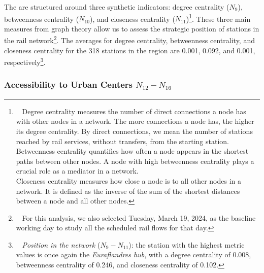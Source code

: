 \begin{refsegment}
The  are structured around three synthetic indicators: degree centrality (\(N_{9}\)), betweenness centrality (\(N_{10}\)), and closeness centrality (\(N_{11}\))\footnote{~
    Degree centrality measures the number of direct connections a node has with other nodes in a network. The more connections a node has, the higher its degree centrality. By direct connections, we mean the number of stations reached by rail services, without transfers, from the starting station.
    \\
    Betweenness centrality quantifies how often a node appears in the shortest paths between other nodes. A node with high betweenness centrality plays a crucial role as a mediator in a network.
    \\
    Closeness centrality measures how close a node is to all other nodes in a network. It is defined as the inverse of the sum of the shortest distances between a node and all other nodes.
}. These three main measures from graph theory allow us to assess the strategic position of stations in the rail network\footnote{~
    For this analysis, we also selected Tuesday, March 19, 2024, as the baseline working day to study all the scheduled rail flows for that day.
}. The averages for degree centrality, betweenness centrality, and closeness centrality for the 318 stations in the region are 0.001, 0.092, and 0.001, respectively\footnote{~
    \textsl{Position in the network} (\(N_{9} - N_{11}\)): the station with the highest metric values is once again the \textsl{Euraflandres hub}, with a degree centrality of 0.008, betweenness centrality of 0.246, and closeness centrality of 0.102.
}.%

\subsubsection*{Accessibility to Urban Centers \(N_{12} - N_{16}\)
    \label{chap6:indicateurs-node-accessibilite-centralites}
    }


\end{refsegment}
